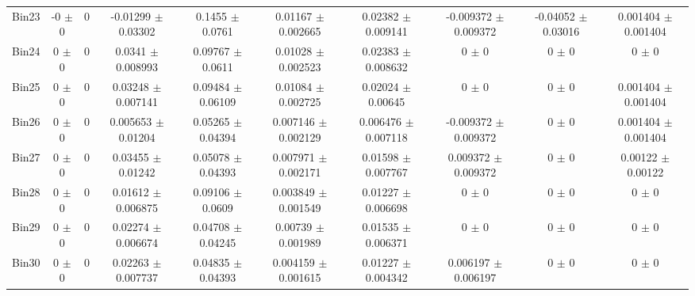 \begin{tabular}{@{\extracolsep{4pt}}lccccccccc@{}}
     Bin23 & -0 $\pm$ 0 & 0 & -0.01299 $\pm$ 0.03302 & 0.1455 $\pm$ 0.0761 & 0.01167 $\pm$ 0.002665 & 0.02382 $\pm$ 0.009141 & -0.009372 $\pm$ 0.009372 & -0.04052 $\pm$ 0.03016 & 0.001404 $\pm$ 0.001404 \\ 
     Bin24 & 0 $\pm$ 0 & 0 & 0.0341 $\pm$ 0.008993 & 0.09767 $\pm$ 0.0611 & 0.01028 $\pm$ 0.002523 & 0.02383 $\pm$ 0.008632 & 0 $\pm$ 0 & 0 $\pm$ 0 & 0 $\pm$ 0 \\ 
     Bin25 & 0 $\pm$ 0 & 0 & 0.03248 $\pm$ 0.007141 & 0.09484 $\pm$ 0.06109 & 0.01084 $\pm$ 0.002725 & 0.02024 $\pm$ 0.00645 & 0 $\pm$ 0 & 0 $\pm$ 0 & 0.001404 $\pm$ 0.001404 \\ 
     Bin26 & 0 $\pm$ 0 & 0 & 0.005653 $\pm$ 0.01204 & 0.05265 $\pm$ 0.04394 & 0.007146 $\pm$ 0.002129 & 0.006476 $\pm$ 0.007118 & -0.009372 $\pm$ 0.009372 & 0 $\pm$ 0 & 0.001404 $\pm$ 0.001404 \\ 
     Bin27 & 0 $\pm$ 0 & 0 & 0.03455 $\pm$ 0.01242 & 0.05078 $\pm$ 0.04393 & 0.007971 $\pm$ 0.002171 & 0.01598 $\pm$ 0.007767 & 0.009372 $\pm$ 0.009372 & 0 $\pm$ 0 & 0.00122 $\pm$ 0.00122 \\ 
     Bin28 & 0 $\pm$ 0 & 0 & 0.01612 $\pm$ 0.006875 & 0.09106 $\pm$ 0.0609 & 0.003849 $\pm$ 0.001549 & 0.01227 $\pm$ 0.006698 & 0 $\pm$ 0 & 0 $\pm$ 0 & 0 $\pm$ 0 \\ 
     Bin29 & 0 $\pm$ 0 & 0 & 0.02274 $\pm$ 0.006674 & 0.04708 $\pm$ 0.04245 & 0.00739 $\pm$ 0.001989 & 0.01535 $\pm$ 0.006371 & 0 $\pm$ 0 & 0 $\pm$ 0 & 0 $\pm$ 0 \\ 
     Bin30 & 0 $\pm$ 0 & 0 & 0.02263 $\pm$ 0.007737 & 0.04835 $\pm$ 0.04393 & 0.004159 $\pm$ 0.001615 & 0.01227 $\pm$ 0.004342 & 0.006197 $\pm$ 0.006197 & 0 $\pm$ 0 & 0 $\pm$ 0 \\ 
\hline\hline
  \end{tabular}
